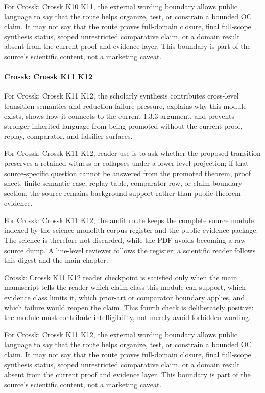 For Crossk: Crossk K10 K11, the external wording boundary allows public language to say that the route helps organize, test, or constrain a bounded OC claim. It may not say that the route proves full-domain closure, final full-scope synthesis status, scoped unrestricted comparative claim, or a domain result absent from the current proof and evidence layer. This boundary is part of the source's scientific content, not a marketing caveat.


\paragraph{Crossk: Crossk K11 K12}

For Crossk: Crossk K11 K12, the scholarly synthesis contributes cross-level transition semantics and reduction-failure pressure, explains why this module exists, shows how it connects to the current 1.3.3 argument, and prevents stronger inherited language from being promoted without the current proof, replay, comparator, and falsifier surfaces.


For Crossk: Crossk K11 K12, reader use is to ask whether the proposed transition preserves a retained witness or collapses under a lower-level projection; if that source-specific question cannot be answered from the promoted theorem, proof sheet, finite semantic case, replay table, comparator row, or claim-boundary section, the source remains background support rather than public theorem evidence.


For Crossk: Crossk K11 K12, the audit route keeps the complete source module indexed by the science monolith corpus register and the public evidence package. The science is therefore not discarded, while the PDF avoids becoming a raw source dump. A line-level reviewer follows the register; a scientific reader follows this digest and the main chapter.


Crossk: Crossk K11 K12 reader checkpoint is satisfied only when the main manuscript tells the reader which claim class this module can support, which evidence class limits it, which prior-art or comparator boundary applies, and which failure would reopen the claim. This fourth check is deliberately positive: the module must contribute intelligibility, not merely avoid forbidden wording.


For Crossk: Crossk K11 K12, the external wording boundary allows public language to say that the route helps organize, test, or constrain a bounded OC claim. It may not say that the route proves full-domain closure, final full-scope synthesis status, scoped unrestricted comparative claim, or a domain result absent from the current proof and evidence layer. This boundary is part of the source's scientific content, not a marketing caveat.


